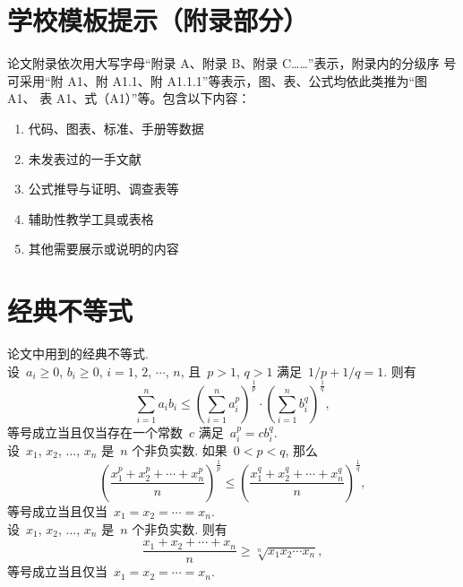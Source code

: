\chapter{学校模板提示（附录部分）}

论文附录依次用大写字母“附录 A、附录 B、附录 C……”表示，附录内的分级序
号可采用“附 A1、附 A1.1、附 A1.1.1”等表示，图、表、公式均依此类推为“图 A1、
表 A1、式（A1）”等。包含以下内容：

\begin{enumerate}
    \item 代码、图表、标准、手册等数据
    \item 未发表过的一手文献
    \item 公式推导与证明、调查表等
    \item 辅助性教学工具或表格
    \item 其他需要展示或说明的内容
\end{enumerate}

\chapter{经典不等式}
论文中用到的经典不等式.\\

设~$a_i\geq0$, $b_i\geq0$, $i=1$, $2$, $\cdots$, $n$, 且~$p>1$, $q>1$ 
满足~$1/p+1/q=1$. 则有
\[
\sum_{i=1}^{n}a_ib_i\leq\left(\sum_{i=1}^{n}a_i^p\right)^{\frac1p}
\cdot\left(\sum_{i=1}^{n}b_i^q\right)^{\frac1q},
\]
等号成立当且仅当存在一个常数~$c$ 满足~$a_i^p=cb_i^q$.\\

设~$x_1$, $x_2$, $\ldots$, $x_n$ 是~$n$ 个非负实数. 如果~$0<p<q$, 那么
\[
\left(\frac{x_1^p+x_2^p+\cdots+x_n^p}{n}\right)^{\frac{1}{p}}\leq
\left(\frac{x_1^q+x_2^q+\cdots+x_n^q}{n}\right)^{\frac{1}{q}},
\]
等号成立当且仅当~$x_1=x_2=\cdots =x_n$.\\

设~$x_1$, $x_2$, $\ldots$, $x_n$ 是~$n$ 个非负实数. 则有
\[
\frac{x_1+x_2+\cdots+x_n}{n}\geq\sqrt[n]{x_1x_2\cdots x_n},
\]
等号成立当且仅当~$x_1=x_2=\cdots =x_n$.